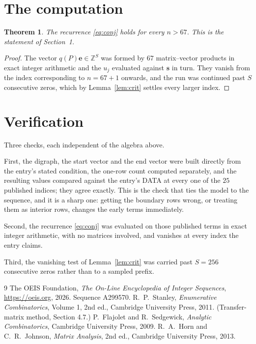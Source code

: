 \documentclass[11pt,a4paper]{article}
\theoremstyle{plain}
\newtheorem{theorem}{Theorem}
\theoremstyle{definition}
\begin{document}
\section{The computation}

\begin{theorem}
The recurrence \eqref{eq:conj} holds for every $n>67$. This is the statement of
Section~1.
\end{theorem}

\begin{proof}
The vector $q(P)\mathbf{e}\in\mathbb{Z}^{S}$ was formed by $67$ matrix--vector
products in exact integer arithmetic and the $u_j$ evaluated against $\mathbf{s}$ in turn.
They vanish from the index corresponding to $n=67+1$ onwards, and the run was continued
past $S$ consecutive zeros, which by Lemma~\ref{lem:crit} settles every larger index.
\end{proof}

\section{Verification}

Three checks, each independent of the algebra above.

First, the digraph, the start vector and the end vector were built directly from the
entry's stated condition, the one-row count computed separately, and the resulting values
compared against the entry's DATA at every one of the $25$ published indices; they
agree exactly. This is the check that ties the model to the sequence, and it is a sharp one:
getting the boundary rows wrong, or treating them as interior rows, changes the early terms
immediately.

Second, the recurrence \eqref{eq:conj} was evaluated on those published terms in exact
integer arithmetic, with no matrices involved, and vanishes at every index the entry claims.

Third, the vanishing test of Lemma~\ref{lem:crit} was carried past $S=256$ consecutive
zeros rather than to a sampled prefix.

\begin{thebibliography}{9}
 The OEIS Foundation, \emph{The On-Line Encyclopedia of Integer
Sequences}, \url{https://oeis.org}, 2026. Sequence A299570.
 R.~P.~Stanley, \emph{Enumerative Combinatorics}, Volume 1, 2nd ed.,
Cambridge University Press, 2011. (Transfer-matrix method, Section 4.7.)
 P.~Flajolet and R.~Sedgewick, \emph{Analytic Combinatorics}, Cambridge
University Press, 2009.
 R.~A.~Horn and C.~R.~Johnson, \emph{Matrix Analysis}, 2nd ed., Cambridge
University Press, 2013.
\end{thebibliography}
\end{document}
